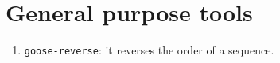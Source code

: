 \chapter{General purpose tools}
\label{seq}

\begin{enumerate}
\item \texttt{goose-reverse}: it reverses the order of a sequence.
\end{enumerate}

%
%
%
%
%
%
%
%
%

%
%
%
%